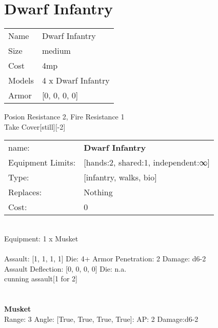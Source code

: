 \pagebreak

\section{ Dwarf Infantry }

\begin{tabular}{ll}
  Name & Dwarf Infantry \\
  Size & medium\\
  Cost & 4mp\\
  Models & 4 x Dwarf Infantry\\
  Armor & [0, 0, 0, 0]\\
\end{tabular}

\noindent Posion Resistance 2, Fire Resistance 1\\ 
Take Cover[still][-2]\\ 


\noindent
\begin{tabular}{ll}
name: &{\bf Dwarf Infantry } \\
Equipment Limits: &[hands:2, shared:1, independent:∞] \\
Type: &[infantry, walks, bio] \\
Replaces: &Nothing \\
Cost: & 0\\
\end{tabular}
\ \\
Equipment: 1 x Musket \\
\ \\
Assault: [1, 1, 1, 1] Die: 4+ Armor Penetration: 2 Damage: d6-2 \\
Assault Deflection: [0, 0, 0, 0] Die: n.a.\\
\indent cunning assault[1 for 2]\\ 
 
\ \\

\ \\
{\bf Musket } \\



Range: 3  Angle: [True, True, True, True]: AP: 2 Damage:d6-2 \\




 
\ \\




